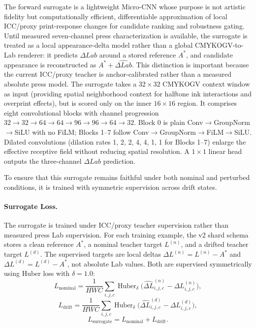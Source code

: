 \documentclass[acmsmall,screen,nonacm]{acmart}
\begin{document}
The forward surrogate is a lightweight Micro-CNN whose purpose is not artistic fidelity but computationally efficient, differentiable approximation of local ICC/proxy print-response changes for candidate ranking and robustness gating. Until measured seven-channel press characterization is available, the surrogate is treated as a local appearance-delta model rather than a global CMYKOGV-to-Lab renderer: it predicts $\Delta Lab$ around a stored reference $A^*$, and candidate appearance is reconstructed as $A^*+\widehat{\Delta Lab}$. This distinction is important because the current ICC/proxy teacher is anchor-calibrated rather than a measured absolute press model. The surrogate takes a $32\times 32$ CMYKOGV context window as input (providing spatial neighborhood context for halftone ink interactions and overprint effects), but is scored only on the inner $16\times 16$ region. It comprises eight convolutional blocks with channel progression $32 \rightarrow 32 \rightarrow 64 \rightarrow 64 \rightarrow 96 \rightarrow 96 \rightarrow 64 \rightarrow 32$. Block 0 is plain Conv$\rightarrow$GroupNorm$\rightarrow$SiLU with no FiLM; Blocks 1--7 follow Conv$\rightarrow$GroupNorm$\rightarrow$FiLM$\rightarrow$SiLU. Dilated convolutions (dilation rates 1, 2, 2, 4, 4, 1, 1 for Blocks 1--7) enlarge the effective receptive field without reducing spatial resolution. A $1\times 1$ linear head outputs the three-channel $\Delta Lab$ prediction.

To ensure that this surrogate remains faithful under both nominal and perturbed conditions, it is trained with symmetric supervision across drift states.

\paragraph{Surrogate Loss.}

The surrogate is trained under ICC/proxy teacher supervision rather than measured press Lab supervision. For each training example, the v2 shard schema stores a clean reference $A^*$, a nominal teacher target $L^{(n)}$, and a drifted teacher target $L^{(d)}$. The supervised targets are local deltas $\Delta L^{(n)}=L^{(n)}-A^*$ and $\Delta L^{(d)}=L^{(d)}-A^*$, not absolute Lab values. Both are supervised symmetrically using Huber loss with $\delta = 1.0$:
\[
L_{\text{nominal}} =
\frac{1}{HWC}\sum_{i,j,c}
\operatorname{Huber}_{\delta}\!\bigl(\widehat{\Delta L}^{(n)}_{i,j,c} - \Delta L^{(n)}_{i,j,c}\bigr),
\]
\[
L_{\text{drift}} =
\frac{1}{HWC}\sum_{i,j,c}
\operatorname{Huber}_{\delta}\!\bigl(\widehat{\Delta L}^{(d)}_{i,j,c} - \Delta L^{(d)}_{i,j,c}\bigr),
\]
\[
L_{\text{surrogate}} = L_{\text{nominal}} + L_{\text{drift}}.
\]
\end{document}
